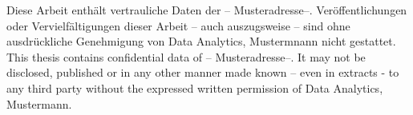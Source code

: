 \thispagestyle{empty}
\begin{flushleft}
Diese Arbeit enthält vertrauliche Daten der -- Musteradresse--. Veröffentlichungen oder Vervielfältigungen dieser Arbeit – auch auszugsweise – sind ohne ausdrückliche Genehmigung von Data Analytics, Mustermnann nicht gestattet.\\
\vspace{1cm}
This thesis contains confidential data of -- Musteradresse--. It may not be disclosed, published or in any other manner made known – even in extracts - to any third party without the expressed written permission of Data Analytics, Mustermann.
\newpage
\end{flushleft}